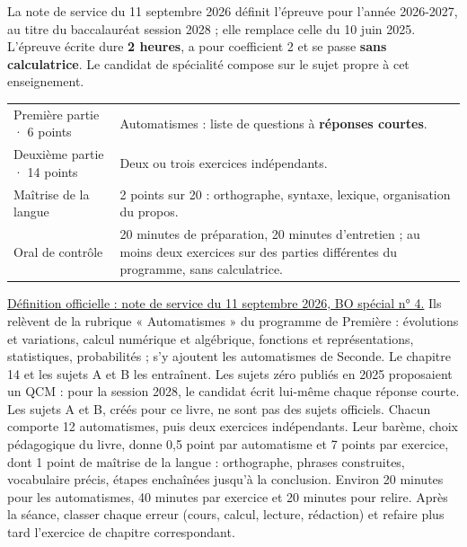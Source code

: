 \clearpage
\gdef\otChapNum{0}\pagestyle{otFront}\label{epreuve-guide}
\fontsize{11}{15}\selectfont
{}
La note de service du 11 septembre 2026 définit l'épreuve pour l'année 2026-2027,
au titre du baccalauréat session 2028 ; elle remplace celle du 10 juin 2025.
L'épreuve écrite dure \textbf{2 heures}, a pour coefficient 2 et se passe
\textbf{sans calculatrice}. Le candidat de spécialité compose sur le sujet propre à cet enseignement.
\par\smallskip
{\renewcommand{\arraystretch}{1.12}\begin{tabularx}{\linewidth}{@{}p{43mm}Y@{}}\toprule
Première partie · 6 points & Automatismes : liste de questions à \textbf{réponses courtes}.\\
Deuxième partie · 14 points & Deux ou trois exercices indépendants.\\
Maîtrise de la langue & 2 points sur 20 : orthographe, syntaxe, lexique, organisation du propos.\\
Oral de contrôle & 20 minutes de préparation, 20 minutes d'entretien ; au moins deux exercices
sur des parties différentes du programme, sans calculatrice.\\\bottomrule
\end{tabularx}}\par\vspace{2mm}
\href{https://www.education.gouv.fr/bo/2026/Special4/MENE2622640N}{\textcolor{otNavy}{Définition officielle : note de service du 11 septembre 2026, BO spécial n° 4.}}
Ils relèvent de la rubrique « Automatismes » du programme de Première : évolutions et
variations, calcul numérique et algébrique, fonctions et représentations, statistiques,
probabilités ; s'y ajoutent les automatismes de Seconde. Le chapitre 14 et les sujets A et B
les entraînent. Les sujets zéro publiés en 2025 proposaient un QCM : pour la session 2028,
le candidat écrit lui-même chaque réponse courte.
Les sujets A et B, créés pour ce livre, ne sont pas des sujets officiels. Chacun comporte
12 automatismes, puis deux exercices indépendants. Leur barème, choix pédagogique du livre, donne 0,5 point
par automatisme et 7 points par exercice, dont 1 point de maîtrise de la langue : orthographe,
phrases construites, vocabulaire précis, étapes enchaînées jusqu'à la conclusion.
Environ 20 minutes pour les automatismes, 40 minutes par exercice et 20 minutes pour relire.
Après la séance, classer chaque erreur (cours, calcul, lecture, rédaction) et refaire plus tard
l'exercice de chapitre correspondant.
\clearpage

